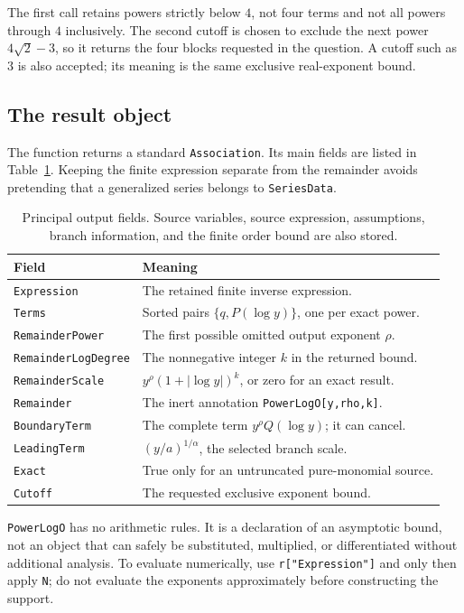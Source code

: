 \documentclass[11pt,a4paper]{article}
\numberwithin{equation}{section}
\theoremstyle{definition}\newtheorem{definition}[theorem]{Definition}
\theoremstyle{remark}\newtheorem{remark}[theorem]{Remark}
\DeclareRobustCommand{\code}[1]{{\small\ttfamily\urlstyle{same}\nolinkurl{#1}}}
\begin{document}
The first call retains powers strictly below \(4\), not four terms and not
all powers through \(4\) inclusively. The second cutoff is chosen to exclude
the next power \(4\sqrt2-3\), so it returns the four blocks requested in the
question. A cutoff such as \(3\) is also accepted; its meaning is the same
exclusive real-exponent bound.

\subsection{The result object}
The function returns a standard \code{Association}. Its main fields are
listed in Table~\ref{tab:fields}. Keeping the finite expression separate
from the remainder avoids pretending that a generalized series belongs to
\code{SeriesData}.

\begin{table}[htbp]
\centering\small
\begin{tabularx}{\textwidth}{@{}lX@{}}
\toprule
Field & Meaning \\
\midrule
\code{Expression} & The retained finite inverse expression. \\
\code{Terms} & Sorted pairs \(\{q,P(\log y)\}\), one per exact power. \\
\code{RemainderPower} & The first possible omitted output exponent \(\rho\). \\
\code{RemainderLogDegree} & The nonnegative integer \(k\) in the returned bound. \\
\code{RemainderScale} & \(y^\rho(1+|\log y|)^k\), or zero for an exact result. \\
\code{Remainder} & The inert annotation \code{PowerLogO[y,rho,k]}. \\
\code{BoundaryTerm} & The complete term \(y^\rho Q(\log y)\); it can cancel. \\
\code{LeadingTerm} & \((y/a)^{1/\alpha}\), the selected branch scale. \\
\code{Exact} & True only for an untruncated pure-monomial source. \\
\code{Cutoff} & The requested exclusive exponent bound. \\
\bottomrule
\end{tabularx}
\caption{Principal output fields. Source variables, source expression,
assumptions, branch information, and the finite order bound are also stored.}
\label{tab:fields}
\end{table}

\code{PowerLogO} has no arithmetic rules. It is a declaration of an
asymptotic bound, not an object that can safely be substituted, multiplied,
or differentiated without additional analysis. To evaluate numerically,
use \code{r["Expression"]} and only then apply \code{N}; do not evaluate
the exponents approximately before constructing the support.
\end{document}
